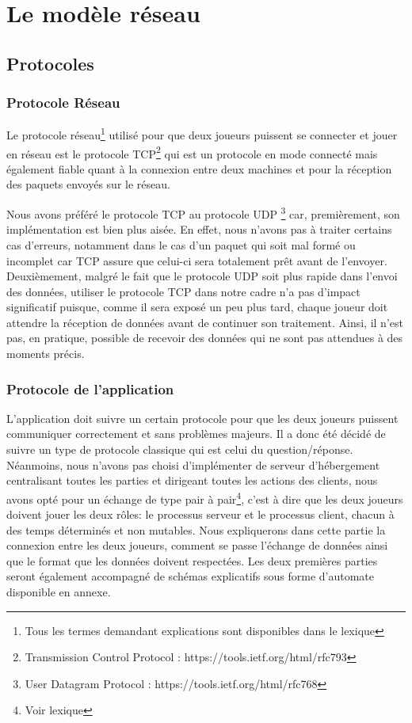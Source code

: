 \section{Le modèle réseau}

\subsection{Protocoles}
	\subsubsection{Protocole Réseau}
	Le protocole réseau\footnote{Tous les termes demandant explications sont disponibles dans le lexique} utilisé pour que deux joueurs puissent se connecter et jouer en réseau est le protocole TCP\footnote{Transmission Control Protocol : https://tools.ietf.org/html/rfc793} qui est un protocole en mode connecté mais également fiable quant à la connexion entre deux machines et pour la réception des paquets envoyés sur le réseau. \newline
	
	Nous avons préféré le protocole TCP au protocole UDP \footnote{User Datagram Protocol : https://tools.ietf.org/html/rfc768} car, premièrement, son implémentation est bien plus aisée. En effet, nous n'avons pas à traiter certains cas d'erreurs, notamment dans le cas d'un paquet qui soit mal formé ou incomplet car TCP assure que celui-ci sera totalement prêt avant de l'envoyer. \newline
	Deuxièmement, malgré le fait que le protocole UDP soit plus rapide dans l'envoi des données, utiliser le protocole TCP dans notre cadre n'a pas d'impact significatif puisque, comme il sera exposé un peu plus tard, chaque joueur doit attendre la réception de données avant de continuer son traitement. Ainsi, il n'est pas, en pratique, possible de recevoir des données qui ne sont pas attendues à des moments précis.

	\subsubsection{Protocole de l'application}
		L'application doit suivre un certain protocole pour que les deux joueurs puissent communiquer correctement et sans problèmes majeurs. Il a donc été décidé de suivre un type de protocole classique qui est celui du question/réponse. Néanmoins, nous n'avons pas choisi d'implémenter de serveur d'hébergement centralisant toutes les parties et dirigeant toutes les actions des clients, nous avons opté pour un échange de type pair à pair\footnote{Voir lexique}, c'est à dire que les deux joueurs doivent jouer les deux rôles: le processus serveur et le processus client, chacun à des temps déterminés et non mutables. \newline
		Nous expliquerons dans cette partie la connexion entre les deux joueurs, comment se passe l'échange de données ainsi que le format que les données doivent respectées. Les deux premières parties seront également accompagné de schémas explicatifs sous forme d'automate disponible en annexe.
		
